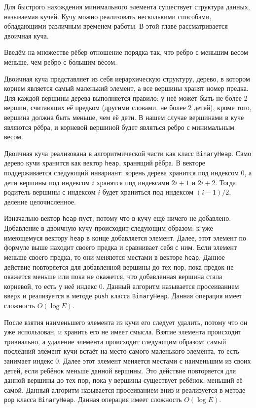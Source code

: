 	Для быстрого нахождения минимального элемента существует структура данных, называемая кучей. Кучу можно реализовать несколькими способами, обладающими различным временем работы. В этой главе рассматривается двоичная куча. 
	
	Введём на множестве рёбер отношение порядка так, что ребро с меньшим весом меньше, чем ребро с большим весом. 
	
	Двоичная куча представляет из себя иерархическую структуру, дерево, в котором корнем является самый маленький элемент, а все вершины хранят номер предка. Для каждой вершины дерева выполняется правило: у неё может быть не более 2 вершин, считающих её предком (другими словами, не более 2 детей), кроме того, вершина должна быть меньше, чем её дети. В нашем случае вершинами в куче являются рёбра, и корневой вершиной будет являться ребро с минимальным весом. 
	
	Двоичная куча реализована в алгоритмической части как класс \texttt{BinaryHeap}. Само дерево кучи хранится как вектор \texttt{heap}, хранящий рёбра. В векторе поддерживается следующий инвариант: корень дерева хранится под индексом $0$, а дети вершины под индексом $i$ хранятся под индексами $2i + 1$ и $2i + 2$. Тогда родитель вершины с индексом $i$ будет храниться под индексом $(i - 1) / 2$, деление целочисленное.
	
	Изначально вектор \texttt{heap} пуст, потому что в кучу ещё ничего не добавлено. Добавление в двоичную кучу происходит следующим образом: к уже имеющемуся вектору \texttt{heap} в конце добавляется элемент. Далее, этот элемент по формуле выше находит своего предка и сравнивает себя с ним. Если элемент меньше своего предка, то они меняются местами в векторе \texttt{heap}. Данное действие повторяется для добавленной вершины до тех пор, пока предок не окажется меньше или пока не окажется, что добавленная вершина стала корневой, то есть у неё индекс $0$. Данный алгоритм называется просеиванием вверх и реализуется в методе \texttt{push} класса \texttt{BinaryHeap}. Данная операция имеет сложность $O(\log E)$.
	
	После взятия наименьшего элемента из кучи его следует удалить, потому что он уже использован, и хранить его не имеет смысла. Взятие элемента происходит тривиально, а удаление элемента происходит следующим образом: самый последний элемент кучи встаёт на место самого маленького элемента, то есть занимает индекс $0$. Далее этот элемент меняется местами с наименьшим из своих детей, если ребёнок меньше данной вершины. Это действие повторяется для данной вершины до тех пор, пока у вершины существует ребёнок, меньший её самой. Данный алгоритм называется просеиванием вниз и реализуется в методе \texttt{pop} класса \texttt{BinaryHeap}. Данная операция имеет сложность $O(\log E)$.
	
